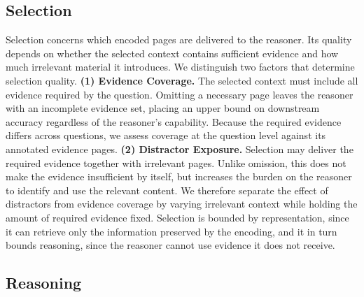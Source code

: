 \documentclass[11pt]{article}
\begin{document}

\subsection{Selection}
\label{subsec:fm_selection}

Selection concerns which encoded pages are delivered to the reasoner. Its quality depends on whether the selected context
contains sufficient evidence and how much irrelevant material it introduces. We distinguish two factors that determine selection quality.
\textbf{(1) Evidence Coverage.} The selected context must include all evidence required by the question. Omitting a necessary page leaves the reasoner with an incomplete evidence set, placing an upper bound on downstream accuracy regardless of the reasoner's capability. 
Because the required evidence differs across questions, we assess coverage at the question level against its annotated evidence pages.
\textbf{(2) Distractor Exposure.} Selection may deliver the required evidence together with irrelevant pages. Unlike omission, this does not make the evidence insufficient by itself, but increases the burden on the reasoner to identify and use the relevant content. We therefore separate the effect of distractors from evidence coverage by varying irrelevant context while holding the amount of required evidence fixed.
Selection is bounded by representation, since it can retrieve only the information preserved by the encoding, and it in turn bounds reasoning, since the reasoner cannot use evidence it does not receive.

\subsection{Reasoning}
\label{subsec:fm_reasoning}
\end{document}
